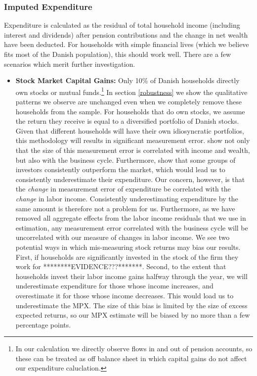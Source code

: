 \documentclass[titlepage]{\econtex}\newcommand{\texname}{ConsumptionHeterogeneity}
\begin{document}
\subsubsection{Imputed Expenditure}
Expenditure is calculated as the residual of total household income (including interest and dividends) after pension contributions and the change in net wealth have been deducted. For households with simple financial lives (which we believe fits most of the Danish population), this should work well. There are a few scenarios which merit further investigation.
\begin{itemize}
	\item \textbf{Stock Market Capital Gains:} Only 10\% of Danish households directly own stocks or mutual funds.\footnote{In our calculation we directly observe flows in and out of pension accounts, so these can be treated as off balance sheet in which capital gains do not affect our expenditure caluclation.} In section \ref{robustness} we show the qualitative patterns we observe are unchanged even when we completely remove these households from the sample. For households that do own stocks, we assume the return they receive is equal to a diversified portfolio of Danish stocks. Given that different households will have their own idiosyncratic portfolios, this methodology will results in significant measurement error. \cite{baker_measurement_2018} show not only that the size of this measurement error is correlated with income and wealth, but also with the business cycle. Furthermore, \cite{fagereng_persistence_2016} show that some groups of investors consistently outperform the market, which would lead us to consistently underestimate their expenditure. Our concern, however, is that the \textit{change} in measurement error of expenditure be correlated with the \textit{change} in labor income. Consistently underestimating expenditure by the same amount is therefore not a problem for us. Furthermore, as we have removed all aggregate effects from the labor income residuals that we use in estimation, any measurement error correlated with the business cycle will be uncorrelated with our measure of changes in labor income. We see two potential ways in which mis-measuring stock returns may bias our results. First, if households are significantly invested in the stock of the firm they work for ********EVIDENCE???*******. Second, to the extent that households invest their labor income gains halfway through the year, we will underestimate expenditure for those whose income increases, and overestimate it for those whose income decreases. This would load us to underestimate the MPX. The size of this bias is limited by the size of excess expected returns, so our MPX estimate will be biased by no more than a few percentage points.

\end{itemize}
\end{document}
